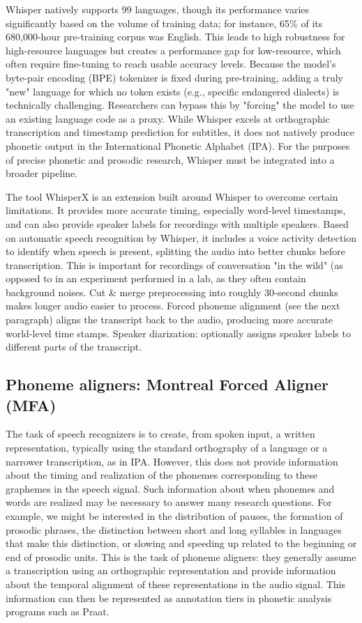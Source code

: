 Whisper natively supports 99 languages, though its performance varies significantly based on the volume of training data; for instance, 65\% of its 680,000-hour pre-training corpus was English. This leads to high robustness for high-resource languages but creates a performance gap for low-resource, which often require fine-tuning to reach usable accuracy levels. Because the model’s byte-pair encoding (BPE) tokenizer is fixed during pre-training, adding a truly "new" language for which no token exists (e.g., specific endangered dialects) is technically challenging. Researchers can bypass this by "forcing" the model to use an existing language code as a proxy. While Whisper excels at orthographic transcription and timestamp prediction for subtitles, it does not natively produce phonetic output in the International Phonetic Alphabet (IPA). For the purposes of precise phonetic and prosodic research, Whisper must be integrated into a broader pipeline. 

The tool WhisperX \cite{bain2023whisperx} is an extension built around Whisper to overcome certain limitations. It provides more accurate timing, especially word-level timestamps, and can also provide speaker labels for recordings with multiple speakers. Based on automatic speech recognition by Whisper, it includes a voice activity detection to identify when speech is present, splitting the audio into better chunks before transcription. This is important for recordings of conversation "in the wild" (as opposed to in an experiment performed in a lab, as they often contain background noises. Cut & merge preprocessing into roughly 30-second chunks makes longer audio easier to process. Forced phoneme alignment (see the next paragraph) aligns the transcript back to the audio, producing more accurate world-level time stamps. Speaker diarization: optionally assigns speaker labels to different parts of the transcript. 


\subsection{Phoneme aligners: Montreal Forced Aligner (MFA)} 

The task of speech recognizers is to create, from spoken input, a written representation, typically using the standard orthography of a language or a narrower transcription, as in IPA. However, this does not provide information about the timing and realization of the phonemes corresponding to these graphemes in the speech signal. Such information about when phonemes and words are realized may be necessary to answer many research questions. For example, we might be interested in the distribution of pauses, the formation of prosodic phrases, the distinction between short and long syllables in languages that make this distinction, or slowing and speeding up related to the beginning or end of prosodic units. This is the task of phoneme aligners: they generally assume a transcription using an orthographic representation and provide information about the temporal alignment of these representations in the audio signal. This information can then be represented as annotation tiers in phonetic analysis programs such as Praat.

